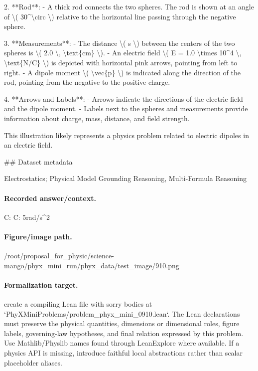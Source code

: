 2. **Rod**:
   - A thick rod connects the two spheres. The rod is shown at an angle of \textbackslash{}( 30\textasciicircum{}\textbackslash{}circ \textbackslash{}) relative to the horizontal line passing through the negative sphere.

3. **Measurements**:
   - The distance \textbackslash{}( s \textbackslash{}) between the centers of the two spheres is \textbackslash{}( 2.0 \textbackslash{}, \textbackslash{}text\{cm\} \textbackslash{}).
   - An electric field \textbackslash{}( E = 1.0 \textbackslash{}times 10\textasciicircum{}4 \textbackslash{}, \textbackslash{}text\{N/C\} \textbackslash{}) is depicted with horizontal pink arrows, pointing from left to right.
   - A dipole moment \textbackslash{}( \textbackslash{}vec\{p\} \textbackslash{}) is indicated along the direction of the rod, pointing from the negative to the positive charge.

4. **Arrows and Labels**:
   - Arrows indicate the directions of the electric field and the dipole moment.
   - Labels next to the spheres and measurements provide information about charge, mass, distance, and field strength.

This illustration likely represents a physics problem related to electric dipoles in an electric field.

\#\# Dataset metadata

Electrostatics; Physical Model Grounding Reasoning, Multi-Formula Reasoning

\paragraph{Recorded answer/context.}
C: C: 5rad/s\textasciicircum{}2

\paragraph{Figure/image path.}
/root/proposal\_for\_physic/science-mango/phyx\_mini\_run/phyx\_data/test\_image/910.png

\paragraph{Formalization target.}
create a compiling Lean file with sorry bodies at `PhyXMiniProblems/problem\_phyx\_mini\_0910.lean`. The Lean declarations must preserve the physical quantities, dimensions or dimensional roles, figure labels, governing-law hypotheses, and final relation expressed by this problem.
Use Mathlib/Physlib names found through LeanExplore where available. If a physics API is missing, introduce faithful local abstractions rather than scalar placeholder aliases.

